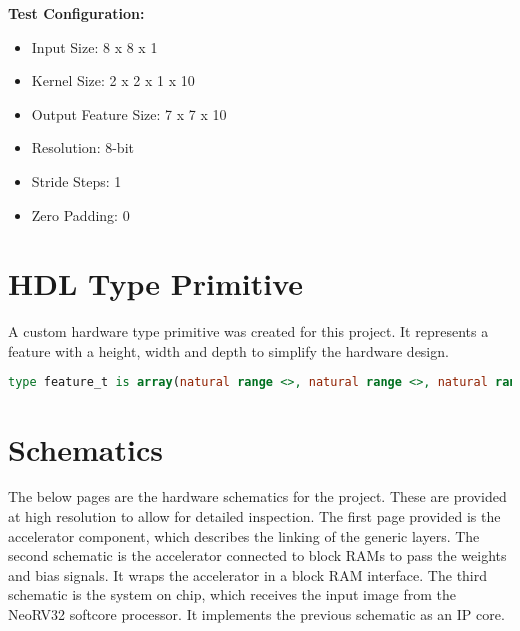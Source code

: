 \textbf{Test Configuration:}
\begin{itemize}
    \item Input Size: 8 x 8 x 1
    \item Kernel Size: 2 x 2 x 1 x 10
    \item Output Feature Size: 7 x 7 x 10
    \item Resolution: 8-bit
    \item Stride Steps: 1
    \item Zero Padding: 0
\end{itemize}

\newpage
\section{HDL Type Primitive}
\label{app:hdl_type_primitive}

A custom hardware type primitive was created for this project. 
It represents a feature with a height, width and depth to simplify the hardware design.

\begin{lstlisting}[language=VHDL]
type feature_t is array(natural range <>, natural range <>, natural range <>) of signed;
\end{lstlisting}

\section{Schematics}
The below pages are the hardware schematics for the project.
These are provided at high resolution to allow for detailed inspection.
The first page provided is the accelerator component, which describes the linking of the generic layers.
The second schematic is the accelerator connected to block RAMs to pass the weights and bias signals. It wraps the accelerator in a block RAM interface.
The third schematic is the system on chip, which receives the input image from the NeoRV32 softcore processor. It implements the previous schematic as an IP core.

\newpage


\newpage


\newpage

